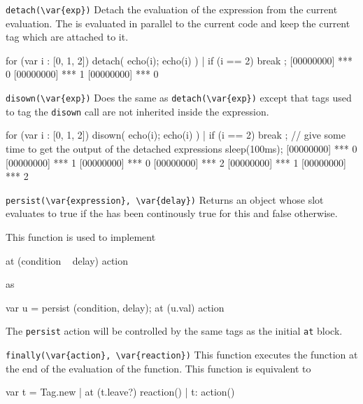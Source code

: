 \begin{urbiscriptapi}

\item \lstinline|detach(\var{exp})|
  Detach the evaluation of the expression  from the current
  evaluation.  The  is evaluated in parallel to the current code
  and keep the current tag which are attached to it.

\begin{urbiscript}
for (var i : [0, 1, 2])
{
  detach({
    echo(i);
    echo(i)
  }) |
  if (i == 2)
    break
};
[00000000] *** 0
[00000000] *** 1
[00000000] *** 0
\end{urbiscript}

\item \lstinline|disown(\var{exp})|
  Does the same as \lstinline|detach(\var{exp})| except that tags used to
  tag the \lstinline|disown| call are not inherited inside the expression.

\begin{urbiscript}
for (var i : [0, 1, 2])
{
  disown({
    echo(i);
    echo(i)
  }) |
  if (i == 2)
    break
};
// give some time to get the output of the detached expressions
sleep(100ms);
[00000000] *** 0
[00000000] *** 1
[00000000] *** 0
[00000000] *** 2
[00000000] *** 1
[00000000] *** 2
\end{urbiscript}

\item \lstinline|persist(\var{expression}, \var{delay})|
   Returns an object whose  slot evaluates to true if the
    has been continously true for this  and false
   otherwise.
  
   This function is used to implement

\begin{urbiunchecked}
at (condition ~ delay)
  action
\end{urbiunchecked}

   as

\begin{urbiunchecked}
var u = persist (condition, delay);
at (u.val)
  action
\end{urbiunchecked}
  
   The \lstinline|persist| action will be controlled by the same tags as the
   initial \lstinline|at| block.


\item \lstinline|finally(\var{action}, \var{reaction})|
  This function executes the  function at the end of the evaluation of
  the  function.  This function is equivalent to

\begin{urbiunchecked}
{
  var t = Tag.new |
  at (t.leave?)
    reaction() |
  t: action()
}
\end{urbiunchecked}


\end{urbiscriptapi}

